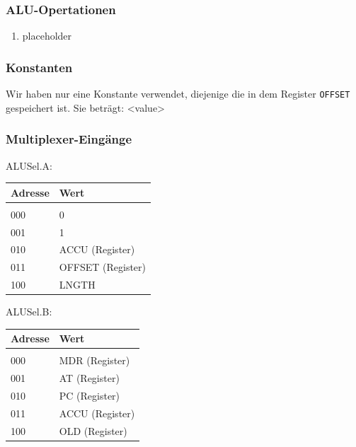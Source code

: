 \documentclass[12pt,titlepage]{article}
\begin{document}
\subsubsection{ALU-Opertationen}

\begin{enumerate}
\item placeholder
\end{enumerate}

\subsubsection{Konstanten}
Wir haben nur eine Konstante verwendet, diejenige die in dem Register \texttt{OFFSET} gespeichert ist. Sie beträgt: <value>

\subsubsection{Multiplexer-Eingänge}

ALUSel.A:

\begin{table}
    \begin{tabular}{l|l}
    Adresse & Wert              \\
    \hline  					\\
    000     & 0                 \\
    001     & 1                 \\
    010     & ACCU (Register)   \\
    011     & OFFSET (Register) \\
    100     & LNGTH             \\
    \end{tabular}
\end{table}

ALUSel.B:

\begin{table}
    \begin{tabular}{l|l}
    Adresse & Wert            \\
    \hline                    \\
    000     & MDR (Register)  \\
    001     & AT (Register)   \\
    010     & PC (Register)   \\
    011     & ACCU (Register) \\
    100     & OLD (Register)  \\
    \end{tabular}
\end{table}
\end{document}
